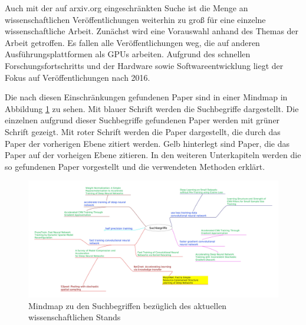 Auch mit der auf arxiv.org eingeschränkten Suche ist die Menge an wissenschaftlichen Veröffentlichungen weiterhin zu groß für eine einzelne wissenschaftliche Arbeit. Zunächst wird eine Vorauswahl anhand des Themas der Arbeit getroffen. Es fallen alle Veröffentlichungen weg, die auf anderen Ausführungsplattformen als GPUs arbeiten. Aufgrund des schnellen Forschungsfortschritts und der Hardware sowie Softwareentwicklung liegt der Fokus auf Veröffentlichungen nach 2016.

Die nach diesen Einschränkungen gefundenen Paper sind in einer Mindmap in Abbildung \ref{abb:mindmap} zu sehen. Mit blauer Schrift werden die Suchbegriffe dargestellt. Die einzelnen aufgrund dieser Suchbegriffe gefundenen Paper werden mit grüner Schrift gezeigt. Mit roter Schrift werden die Paper dargestellt, die durch das Paper der vorherigen Ebene zitiert werden. Gelb hinterlegt sind Paper, die das Paper auf der vorheigen Ebene zitieren. In den weiteren Unterkapiteln werden die so gefundenen Paper vorgestellt und die verwendeten Methoden erklärt. 

\begin{figure}[h]
 \centering
 \includegraphics[width=1\textwidth]{KapitelPartA/images/mindmap.jpg}
 \caption{Mindmap zu den Suchbegriffen bezüglich des aktuellen wissenschaftlichen Stands}
 \label{abb:mindmap}
\end{figure}


